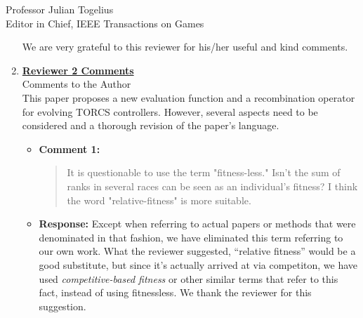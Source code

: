 \documentclass[10pt]{letter} %
\begin{document}
\begin{letter}{Professor Julian Togelius \\ Editor in Chief, IEEE Transactions on Games}
\begin{enumerate}
We are very grateful to this reviewer for his/her useful and kind comments.

\newpage


\item {\bf \underline{ Reviewer 2 Comments}}\\
	Comments to the Author\\
This paper proposes a new evaluation function and a recombination operator for evolving TORCS controllers. However, several aspects need to be considered and a thorough revision of the paper's language.

	\begin{itemize}

		\item {\bf Comment 1:}
		\begin{quote}
	It is questionable to use the term "fitness-less." Isn't the sum of ranks in several races can be seen as an individual's fitness? I think the word "relative-fitness" is more suitable.
		\end{quote}
		\item {\bf Response:} Except when referring to actual
                  papers or methods that were denominated in that
                  fashion, we have eliminated this term referring to
                  our own work. What the reviewer suggested,
                  ``relative fitness'' would be a good substitute, but
                  since it's actually arrived at via competiton, we
                  have used {\em competitive-based fitness} or other
                  similar terms that refer to this fact, instead of
                  using fitnessless. We thank the reviewer for this
                  suggestion.


\end{itemize}
\end{enumerate}
\end{letter}
\end{document}
